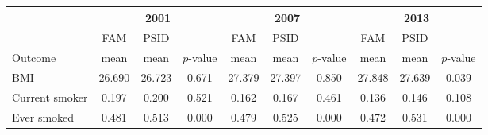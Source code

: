 \begin{tabular}{p{1.2in}*{3}{c}*{3}{c}*{3}{c}}
\toprule
 \multicolumn{1}{c}{} & \multicolumn{3}{c}{2001} & \multicolumn{3}{c}{2007} & \multicolumn{3}{c}{2013} \\
\midrule
 \multicolumn{1}{c}{} & FAM & PSID & & FAM & PSID & & FAM & PSID & \\
 \multicolumn{1}{l}{Outcome} & mean & mean & $p$-value & mean & mean & $p$-value & mean & mean & $p$-value \\
\midrule
BMI&26.690&26.723&0.671&27.379&27.397&0.850&27.848&27.639&0.039\\
Current smoker&0.197&0.200&0.521&0.162&0.167&0.461&0.136&0.146&0.108\\
Ever smoked&0.481&0.513&0.000&0.479&0.525&0.000&0.472&0.531&0.000\\
\bottomrule
\end{tabular}
